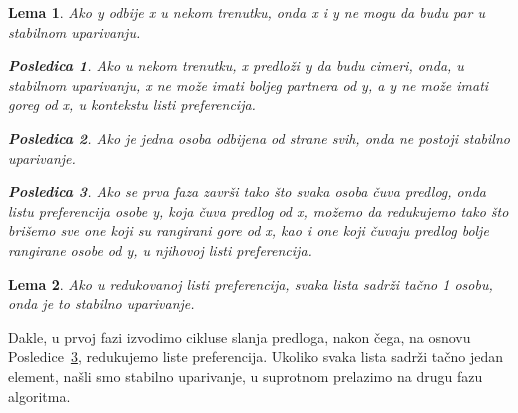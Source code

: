 \documentclass[a4paper]{article}
\newtheorem{lemma}{Lema}
\newtheorem{corollary}{Posledica}[lemma]  %
\begin{document}
\begin{lemma}
    Ako y odbije x u nekom trenutku, onda x i y ne mogu da budu par u stabilnom uparivanju.

    \begin{corollary}
        Ako u nekom trenutku, x predloži y da budu cimeri, onda, u stabilnom uparivanju, x ne može imati boljeg partnera od y, a y ne može imati goreg od x, u kontekstu listi preferencija.
    \end{corollary}

    \begin{corollary}
        Ako je jedna osoba odbijena od strane svih, onda ne postoji stabilno uparivanje.
    \end{corollary}

    \begin{corollary}\label{posl3}
        Ako se prva faza završi tako što svaka osoba čuva predlog, onda listu preferencija osobe y, koja čuva predlog od x, možemo da redukujemo tako što brišemo sve one koji su rangirani gore od x, kao i one koji čuvaju predlog bolje rangirane osobe od y, u njihovoj listi preferencija.
    \end{corollary}
    
\end{lemma}

\begin{lemma}
    Ako u redukovanoj listi preferencija, svaka lista sadrži tačno 1 osobu, onda je to stabilno uparivanje.    
\end{lemma}

Dakle, u prvoj fazi izvodimo cikluse slanja predloga, nakon čega, na osnovu Posledice~\ref{posl3}, redukujemo liste preferencija. Ukoliko svaka lista sadrži tačno jedan element, našli smo stabilno uparivanje, u suprotnom prelazimo na drugu fazu algoritma.  
\end{document}
